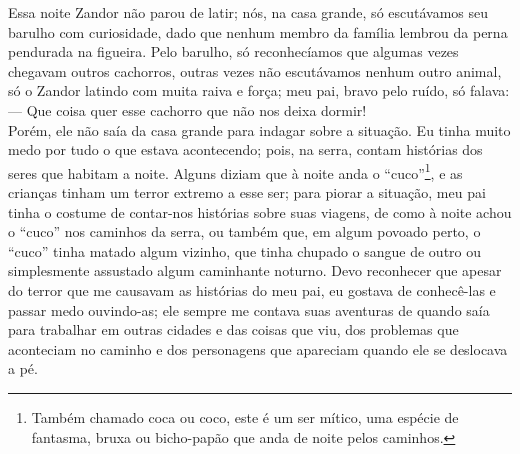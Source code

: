 Essa noite Zandor não parou de latir; nós, na casa grande, só escutávamos seu barulho com curiosidade, dado que nenhum membro da família lembrou da perna pendurada na figueira. 
Pelo barulho, só reconhecíamos que algumas vezes chegavam outros cachorros, outras vezes não escutávamos nenhum outro animal, só o Zandor latindo com muita raiva e força; meu pai, bravo pelo ruído, só falava:\\\indent
--- Que coisa quer esse cachorro que não nos deixa dormir!\\\indent
Porém, ele não saía da casa grande para indagar sobre a situação. 
Eu tinha muito medo por tudo o que estava acontecendo; pois, na serra, contam histórias dos seres que habitam a noite. 
Alguns diziam que à noite anda o ``cuco''\footnote{Também chamado coca ou coco, este é um ser mítico, uma espécie de fantasma, bruxa ou bicho-papão que anda de noite pelos caminhos.}, e as crianças tinham um terror extremo a esse ser; para piorar a situação, meu pai tinha o costume de contar-nos histórias sobre suas viagens, de como à noite achou o ``cuco'' nos caminhos da serra, ou também que, em algum povoado perto, o ``cuco'' tinha matado algum vizinho, que tinha chupado o sangue de outro ou simplesmente assustado algum caminhante noturno. Devo reconhecer que apesar do terror que me causavam as histórias do meu pai, eu gostava de conhecê-las e passar medo ouvindo-as; ele sempre me contava suas aventuras de quando saía para trabalhar em outras cidades e das coisas que viu, dos problemas que aconteciam no caminho e dos personagens que apareciam quando ele se deslocava a pé.

